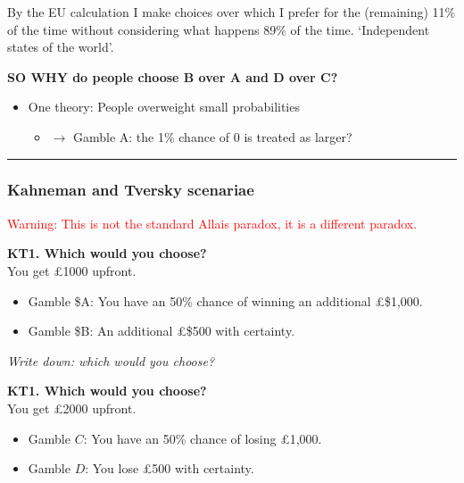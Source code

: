 \documentclass[]{article}
\providecommand{\tightlist}{%
  \setlength{\itemsep}{0pt}\setlength{\parskip}{0pt}}
\begin{document}
By the EU calculation I make choices over which I prefer for the
(remaining) 11\% of the time without considering what happens 89\% of
the time. `Independent states of the world'.

\textbf{SO WHY do people choose B over A and D over C?}

\begin{itemize}
\tightlist
\item
  One theory: People overweight small probabilities

  \begin{itemize}
  \tightlist
  \item
    \(\rightarrow\) Gamble A: the 1\% chance of 0 is treated as larger?
  \end{itemize}
\end{itemize}

\begin{center}\rule{0.5\linewidth}{\linethickness}\end{center}

\hypertarget{kahneman-and-tversky-scenariae}{%
\subsubsection{Kahneman and Tversky
scenariae}\label{kahneman-and-tversky-scenariae}}

\textcolor{red}{Warning: This is not the standard Allais paradox, it is a different paradox.}

\textbf{KT1. Which would you choose?}\\

You get \pounds1000 upfront.\\

\begin{itemize}
\item
  Gamble \$A: You have an 50\% chance of winning an additional
  \pounds\$1,000.
\item
  Gamble \$B: An additional \pounds\$500 with certainty.
\end{itemize}

\emph{Write down: which would you choose?}

\hrulefill

\bigskip

\textbf{KT1. Which would you choose?}\\

You get \pounds2000 upfront.\\

\begin{itemize}
\item
  Gamble \(C\): You have an 50\% chance of losing \pounds1,000.
\item
  Gamble \(D\): You lose \pounds500 with certainty.
\end{itemize}
\end{document}
